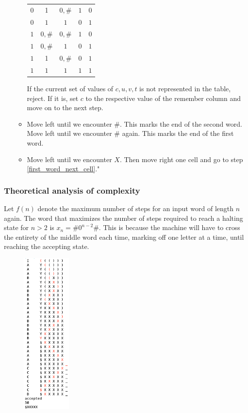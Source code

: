 \begin{enumerate}
\begin{itemize}
\begin{center}
\begin{tabular}{cccc|c}
                        $0$ & 1 & $0,\#$ & $1$ & $0$ \\
                        $0$ & $1$ & $1$ & $0$ & $1$ \\
                        $1$ & $0,\#$ & $0,\#$ & $1$ & $0$ \\
                        $1$ & $0,\#$ & $1$ & $0$ & $1$ \\
                        $1$ & 1 & $0,\#$ & $0$ & $1$ \\
                        $1$ & $1$ & $1$ & $1$ & $1$ \\
                    \end{tabular}
                \end{center}
                If the current set of values of $c,u,v,t$ is not represented in the table, reject. If it is, set $c$ to the respective value of the remember column and move on to the next step.
            \item Move left until we encounter $\#$. This marks the end of the second word. Move left until we encounter $\#$ again. This marks the end of the first word.
            \item Move left until we encounter $X$. Then move right one cell and go to step \ref{first_word_next_cell}."
        \end{itemize}
\end{enumerate}

\subsubsection{Theoretical analysis of complexity}

Let $f(n)$ denote the maximum number of steps for an input word of length $n$ again. 
The word that maximizes the number of steps required to reach a halting state for $n>2$ is $x_n=\# 0^{n-2} \#$. 
This is because the machine will have to cross the entirety of the middle word each time, marking off one letter at a time, until reaching the accepting state. 

\begin{figure}
    \centering
    \includegraphics[width=2.5cm]{images/screenshots/paren.png}
    \vspace{-5cm}
\end{figure}

